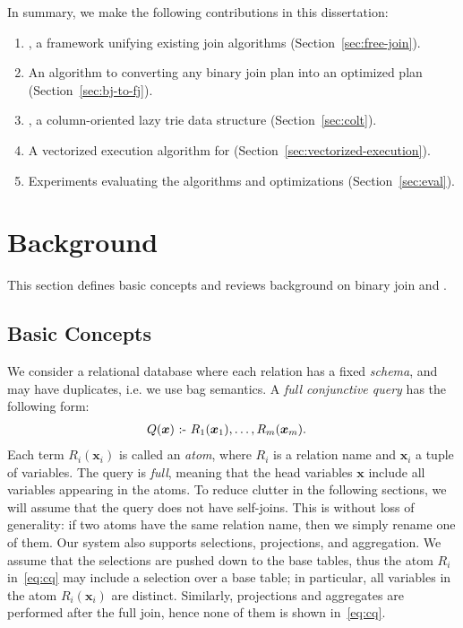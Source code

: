  
In summary, we make the following contributions in this dissertation:
\begin{enumerate}
  \item \FJ, a framework unifying existing join algorithms (Section~\ref{sec:free-join}).
  \item An algorithm to converting any binary join plan into an
    optimized \FJ plan (Section~\ref{sec:bj-to-fj}).
  \item \COLT, a column-oriented lazy trie data structure (Section~\ref{sec:colt}).
  \item A vectorized execution algorithm for \FJ (Section~\ref{sec:vectorized-execution}).
  \item Experiments evaluating the algorithms and optimizations (Section~\ref{sec:eval}).
\end{enumerate}

\section{Background}\label{sec:background:fj}

This section defines basic concepts and reviews background on binary
join and \GJ.

\subsection{Basic Concepts}\label{sec:basic-concepts}

We consider a relational database where each relation has a fixed
\emph{schema}, and may have duplicates, i.e. we use bag semantics.
A \emph{full conjunctive query} has the following form:
%
\begin{align}
  Q(\bm x) \text{ :- } & R_1(\bm x_1), \ldots, R_m(\bm x_m). \label{eq:cq}
\end{align}
%
Each term $R_i(\bm x_i)$ is called an \emph{atom}, where $R_i$ is a
relation name and $\bm x_i$ a tuple of variables.  The query is
\emph{full}, meaning that the head variables $\bm x$ include all
variables appearing in the atoms.  To reduce clutter in the following
sections, we will assume that the query does not have self-joins.
This is without loss of generality: if two atoms have the same
relation name, then we simply rename one of them.  Our system also
supports selections, projections, and aggregation.  We assume that the
selections are pushed down to the base tables, thus the atom $R_i$
in~\eqref{eq:cq} may include a selection over a base table; in
particular, all variables in the atom $R_i(\bm x_i)$ are distinct.
Similarly, projections and aggregates are performed after the full
join, hence none of them is shown in~\eqref{eq:cq}.


